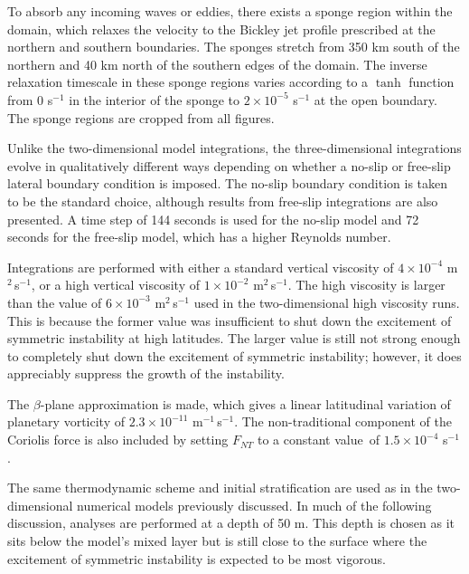 To absorb any incoming waves or eddies, there exists a sponge region within the domain, which relaxes the velocity to the Bickley jet profile prescribed at the northern and southern boundaries. The sponges stretch from 350 km south of the northern and 40 km north of the southern edges of the domain. The inverse relaxation timescale in these sponge regions varies according to a $\tanh$ function from 0 s$^{-1}$ in the interior of the sponge to $2 \times 10^{-5}$ s$^{-1}$ at the open boundary. The sponge regions are cropped from all figures.

Unlike the two-dimensional model integrations, the three-dimensional integrations evolve in qualitatively different ways depending on whether a no-slip or free-slip lateral boundary condition is imposed. The no-slip boundary condition is taken to be the standard choice, although results from free-slip integrations are also presented. A time step of 144 seconds is used for the no-slip model and 72 seconds for the free-slip model, which has a higher Reynolds number.

Integrations are performed with either a standard vertical viscosity of $4\times 10^{-4}$ m$^2$\,s$^{-1}$, or a high vertical viscosity of $1\times 10^{-2}$ m$^2$\,s$^{-1}$. The high viscosity is larger than the value of $6\times 10^{-3}$ m$^2$\,s$^{-1}$ used in the two-dimensional high viscosity runs. This is because the former value was insufficient to shut down the excitement of symmetric instability at high latitudes. The larger value is still not strong enough to completely shut down the excitement of symmetric instability; however, it does appreciably suppress the growth of the instability.

The $\beta$-plane approximation is made, which gives a linear latitudinal variation of planetary vorticity of $2.3\times 10^{-11}$ m$^{-1}$\,s$^{-1}$. The non-traditional component of the Coriolis force is also included by setting $F_{NT}$ to a constant value\footnotemark~of $1.5\times 10^{-4}$ s$^{-1}$.


The same thermodynamic scheme and initial stratification are used as in the two-dimensional numerical models previously discussed. In much of the following discussion, analyses are performed at a depth of 50 m. This depth is chosen as it sits below the model's mixed layer but is still close to the surface where the excitement of symmetric instability is expected to be most vigorous.

